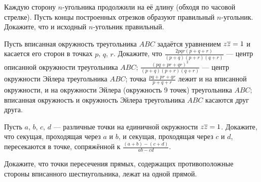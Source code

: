 \documentclass[a4paper,11pt]{article}
\begin{document}
 Каждую сторону $n$-угольника продолжили на её длину (обходя по часовой стрелке). Пусть концы построенных
отрезков образуют правильный $n$-угольник. Докажите, что и исходный $n$-угольник правильный.



Пусть вписанная окружность треугольника $ABC$ задаётся уравнением $z\overline{z}=1$ и касается его сторон в точках $p$, $q$, $r$. Докажите, что
 $\frac{2pqr(p+q+r)}{(p+q)(p+r)(q+r)}$ --- центр описанной окружности треугольника $ABC$;
 $\frac{(pq+pr+qr)^2}{(p+q)(p+r)(q+r)}$ --- центр окружности Эйлера треугольника $ABC$;
 точка $\frac{pq+pr+qr}{p+q+r}$ лежит и на вписанной окружности, и на окружности Эйлера (окружность 9 точек) треугольника $ABC$;
 вписанная окружность и окружность Эйлера треугольника $ABC$ касаются друг друга.

 Пусть $a$, $b$, $c$, $d$ --- различные точки на единичной окружности
$z\overline{z}=1$. Докажите, что секущая, проходящая через $a$ и $b$, и секущая, проходящая через $c$ и $d$, пересекаются в точке, сопряжённой к
$\frac{(a+b)-(c+d)}{ab-cd}$.

 Докажите, что точки пересечения прямых, содержащих противоположные стороны вписанного шестиугольника, лежат на одной прямой.







\end{document}
